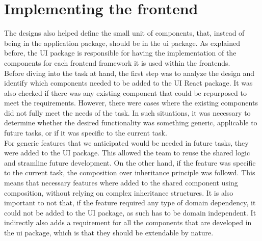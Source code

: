 \documentclass[./memory.tex]{subfiles}
\begin{document}
\section{Implementing the frontend}
The designs also helped define the small unit of components, that, instead of
being in the application package, should be in the ui package. As explained
before, the UI package is responsible for having the implementation of the
components for each frontend framework it is used within the frontends.
\\[8pt]
Before diving into the task at hand, the first step was to analyze the design
and identify which components needed to be added to the UI React package. It was
also checked if there was any existing component that could be repurposed to
meet the requirements. However, there were cases where the existing components
did not fully meet the needs of the task. In such situations, it was necessary
to determine whether the desired functionality was something generic, applicable
to future tasks, or if it was specific to the current task.
\\
For generic features that we anticipated would be needed in future tasks, they
were added to the UI package. This allowed the team to reuse the shared logic
and stramline future development. On the other hand, if the feature was specific
to the current task, the composition over inheritance principle was followd.
This means that necessary features where added to the shared component using
composition, without relying on complex inheritance structures. It is also
important to not that, if the feature required any type of domain dependency, it
could not be added to the UI package, as such has to be domain independent. It
indirectly also adds a requirement for all the components that are developed in
the ui package, which is that they should be extendable by nature.
\end{document}
